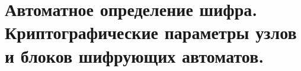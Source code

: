 \section{Автоматное определение шифра. Криптографические параметры узлов и блоков шифрующих автоматов.}